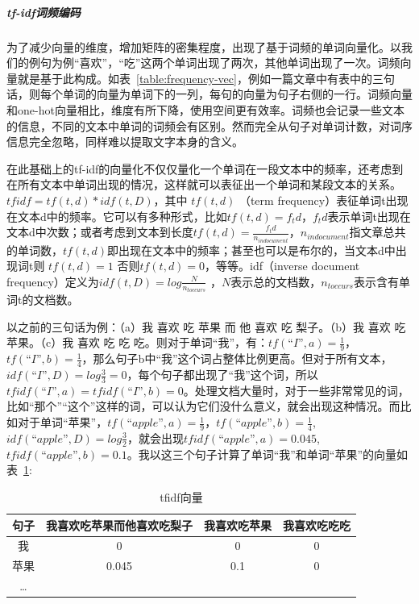 \subparagraph{tf-idf词频编码}

为了减少向量的维度，增加矩阵的密集程度，出现了基于词频的单词向量化。以我们的例句为例“喜欢”，“吃”这两个单词出现了两次，其他单词出现了一次。词频向量就是基于此构成。如表~\ref{table:frequency-vec}，例如一篇文章中有表中的三句话，则每个单词的向量为单词下的一列，每句的向量为句子右侧的一行。词频向量和one-hot向量相比，维度有所下降，使用空间更有效率。词频也会记录一些文本的信息，不同的文本中单词的词频会有区别。然而完全从句子对单词计数，对词序信息完全忽略，同样难以提取文字本身的含义。

在此基础上的tf-idf的向量化不仅仅量化一个单词在一段文本中的频率，还考虑到在所有文本中单词出现的情况，这样就可以表征出一个单词和某段文本的关系。\cite{xia2011improvement}$tfidf = tf(t,d)*idf(t,D)$，其中 $tf(t,d)$ （term frequency）表征单词t出现在文本d中的频率。它可以有多种形式，比如$tf(t,d)=f_td$，$f_td$表示单词t出现在文本d中次数；或者考虑到文本到长度$tf(t,d)= \frac{f_td}{n_{in document}}$，$n_{in document}$指文章总共的单词数，$tf(t,d)$即出现在文本中的频率；甚至也可以是布尔的，当文本d中出现词t则 $tf(t,d)=1$ 否则$tf(t,d)=0$，等等。idf（inverse document frequency）定义为$idf(t,D) = log\frac{N}{n_{t occurs}}$ ，$N$表示总的文档数，$n_{t occurs}$表示含有单词t的文档数。

以之前的三句话为例：（a）我 喜欢 吃 苹果 而 他 喜欢 吃 梨子。（b）我 喜欢 吃 苹果。（c）我 喜欢 吃 吃 吃。则对于单词“我”，有：$tf(“I”,a)= \frac{1}{9}$，$tf(“I”,b)= \frac{1}{4}$，那么句子b中“我”这个词占整体比例更高。但对于所有文本，$idf(“I”,D) = log\frac{3}{3} = 0$，每个句子都出现了“我”这个词，所以$tfidf(“I”,a) = tfidf(“I”,b) = 0$。处理文档大量时，对于一些非常常见的词，比如“那个”“这个”这样的词，可以认为它们没什么意义，就会出现这种情况。而比如对于单词“苹果”，$tf(“apple”,a)= \frac{1}{9}$，$tf(“apple”,b)= \frac{1}{4}$,$idf(“apple”,D) = log\frac{3}{2} $，就会出现$tfidf(“apple”,a) = 0.045$,$tfidf(“apple”,b) = 0.1$。我以这三个句子计算了单词“我”和单词“苹果”的向量如表~\ref{table:tfidf-vec}:

\begin{table}[!htbp]
\caption{tfidf向量}
\label{table:tfidf-vec}
\centering
\begin{tabular}{|c|c|c|c|}
\hline
句子 & 我喜欢吃苹果而他喜欢吃梨子 & 我喜欢吃苹果 & 我喜欢吃吃吃  \\
\hline
我 & 0 & 0 & 0  \\
\hline
苹果 & 0.045 & 0.1 & 0 \\
\hline
… &  &  &  \\
\hline
\end{tabular}
\end{table}

